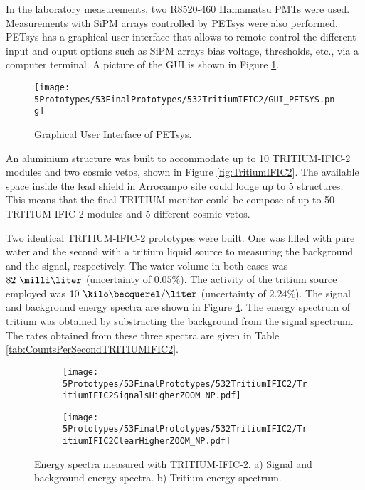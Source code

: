 In the laboratory measurements, two R8520-460 Hamamatsu PMTs \cite{DataSheetPMTs} were used. Measurements with SiPM arrays controlled by PETsys were also performed. PETsys has a graphical user interface that allows to remote control the different input and ouput options such as SiPM arrays bias voltage, thresholds, etc., via a computer terminal. A picture of the GUI is shown in Figure \ref{fig:GUI_PETSYS}.
\begin{figure}[h]
\centering
\texttt{[image: 5Prototypes/53FinalPrototypes/532TritiumIFIC2/GUI\_PETSYS.png]}
\caption{Graphical User Interface of PETsys.\label{fig:GUI_PETSYS}}
\end{figure} 

An aluminium structure was built to accommodate up to 10 TRITIUM-IFIC-2 modules and two cosmic vetos, shown in Figure \ref{fig:TritiumIFIC2}. The available space inside the lead shield in Arrocampo site could lodge up to 5 structures. This means that the final TRITIUM monitor could be compose of up to 50 TRITIUM-IFIC-2 modules and 5 different cosmic vetos.

Two identical TRITIUM-IFIC-2 prototypes were built. One was filled with pure water and the second with a tritium liquid source to measuring the background and the signal, respectively. The water volume in both cases was $82~\milli\liter$ (uncertainty of $0.05\%$). The activity of the tritium source employed was $10~\kilo\becquerel/\liter$ (uncertainty of $2.24\%$). The signal and background energy spectra are shown in Figure \ref{fig:EnergySpectraTRITIUMIFIC2}. The energy spectrum of tritium was obtained by substracting the background from the signal spectrum. The rates obtained from these three spectra are given in Table \ref{tab:CountsPerSecondTRITIUMIFIC2}. 

\begin{figure}
\centering
    \begin{subfigure}[b]{0.9\textwidth}
    \centering
    \texttt{[image: 5Prototypes/53FinalPrototypes/532TritiumIFIC2/TritiumIFIC2SignalsHigherZOOM\_NP.pdf]}  
    \caption{\label{subfig:SignalBackgroundEnergySpectraTritiumIFIC2}}
    \end{subfigure}
    \hfill
    \begin{subfigure}[b]{0.9\textwidth}
    \centering
    \texttt{[image: 5Prototypes/53FinalPrototypes/532TritiumIFIC2/TritiumIFIC2ClearHigherZOOM\_NP.pdf]}  
    \caption{\label{subfig:TritiumEnergySpectraTritiumIFIC2}}
    \end{subfigure}
 \caption{Energy spectra measured with TRITIUM-IFIC-2. a) Signal and background energy spectra. b) Tritium energy spectrum.}
 \label{fig:EnergySpectraTRITIUMIFIC2}
\end{figure}

